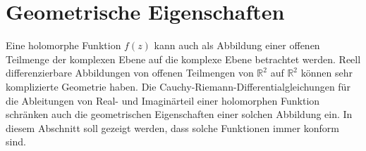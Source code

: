 %
%
%
\section{Geometrische Eigenschaften%
\label{buch:holomorph:section:geometrie}}
Eine holomorphe Funktion $f(z)$ kann auch als Abbildung einer
offenen Teilmenge der komplexen Ebene auf die komplexe Ebene
betrachtet werden.
Reell differenzierbare Abbildungen von offenen Teilmengen von
$\mathbb{R}^2$ auf $\mathbb{R}^2$ können sehr komplizierte
Geometrie haben.
Die Cauchy-Riemann-Differentialgleichungen
für die Ableitungen von Real- und Imaginärteil einer holomorphen Funktion
schränken auch die geometrischen Eigenschaften einer solchen
Abbildung ein.
In diesem Abschnitt soll gezeigt werden, dass solche Funktionen
immer konform sind.




